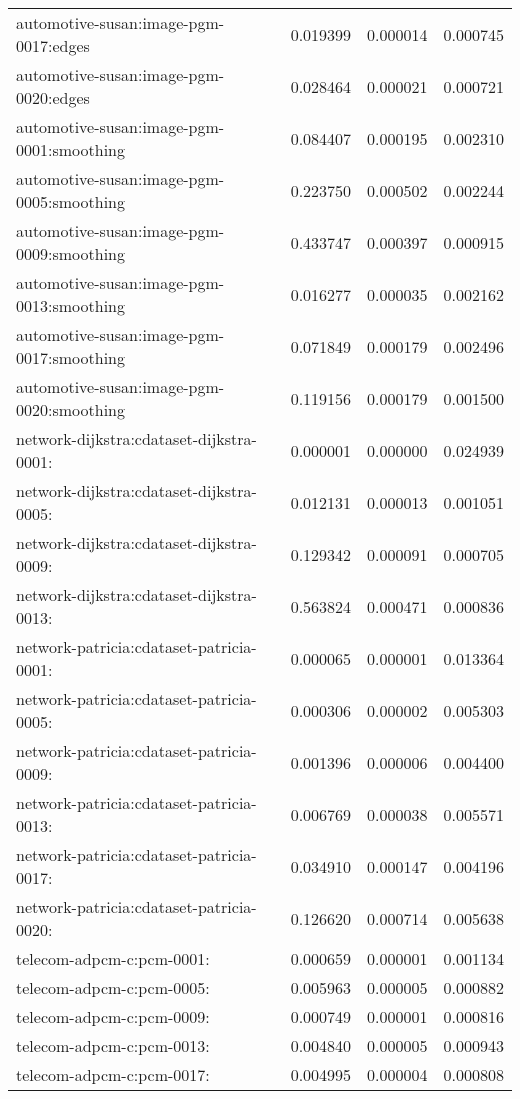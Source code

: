 \begin{longtable}{lrrr}
automotive-susan:image-pgm-0017:edges & 0.019399 & 0.000014 & 0.000745 \\
automotive-susan:image-pgm-0020:edges & 0.028464 & 0.000021 & 0.000721 \\
automotive-susan:image-pgm-0001:smoothing & 0.084407 & 0.000195 & 0.002310 \\
automotive-susan:image-pgm-0005:smoothing & 0.223750 & 0.000502 & 0.002244 \\
automotive-susan:image-pgm-0009:smoothing & 0.433747 & 0.000397 & 0.000915 \\
automotive-susan:image-pgm-0013:smoothing & 0.016277 & 0.000035 & 0.002162 \\
automotive-susan:image-pgm-0017:smoothing & 0.071849 & 0.000179 & 0.002496 \\
automotive-susan:image-pgm-0020:smoothing & 0.119156 & 0.000179 & 0.001500 \\
network-dijkstra:cdataset-dijkstra-0001: & 0.000001 & 0.000000 & 0.024939 \\
network-dijkstra:cdataset-dijkstra-0005: & 0.012131 & 0.000013 & 0.001051 \\
network-dijkstra:cdataset-dijkstra-0009: & 0.129342 & 0.000091 & 0.000705 \\
network-dijkstra:cdataset-dijkstra-0013: & 0.563824 & 0.000471 & 0.000836 \\
network-patricia:cdataset-patricia-0001: & 0.000065 & 0.000001 & 0.013364 \\
network-patricia:cdataset-patricia-0005: & 0.000306 & 0.000002 & 0.005303 \\
network-patricia:cdataset-patricia-0009: & 0.001396 & 0.000006 & 0.004400 \\
network-patricia:cdataset-patricia-0013: & 0.006769 & 0.000038 & 0.005571 \\
network-patricia:cdataset-patricia-0017: & 0.034910 & 0.000147 & 0.004196 \\
network-patricia:cdataset-patricia-0020: & 0.126620 & 0.000714 & 0.005638 \\
telecom-adpcm-c:pcm-0001: & 0.000659 & 0.000001 & 0.001134 \\
telecom-adpcm-c:pcm-0005: & 0.005963 & 0.000005 & 0.000882 \\
telecom-adpcm-c:pcm-0009: & 0.000749 & 0.000001 & 0.000816 \\
telecom-adpcm-c:pcm-0013: & 0.004840 & 0.000005 & 0.000943 \\
telecom-adpcm-c:pcm-0017: & 0.004995 & 0.000004 & 0.000808 \\

\end{longtable}
